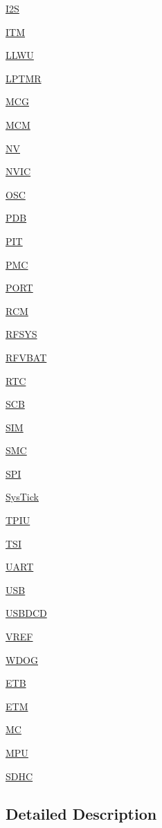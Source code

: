 \begin{DoxyCompactItemize}
\hyperlink{group___i2_s___peripheral}{I2S}
\item 
\hyperlink{group___i_t_m___peripheral}{I\+TM}
\item 
\hyperlink{group___l_l_w_u___peripheral}{L\+L\+WU}
\item 
\hyperlink{group___l_p_t_m_r___peripheral}{L\+P\+T\+MR}
\item 
\hyperlink{group___m_c_g___peripheral}{M\+CG}
\item 
\hyperlink{group___m_c_m___peripheral}{M\+CM}
\item 
\hyperlink{group___n_v___peripheral}{NV}
\item 
\hyperlink{group___n_v_i_c___peripheral}{N\+V\+IC}
\item 
\hyperlink{group___o_s_c___peripheral}{O\+SC}
\item 
\hyperlink{group___p_d_b___peripheral}{P\+DB}
\item 
\hyperlink{group___p_i_t___peripheral}{P\+IT}
\item 
\hyperlink{group___p_m_c___peripheral}{P\+MC}
\item 
\hyperlink{group___p_o_r_t___peripheral}{P\+O\+RT}
\item 
\hyperlink{group___r_c_m___peripheral}{R\+CM}
\item 
\hyperlink{group___r_f_s_y_s___peripheral}{R\+F\+S\+YS}
\item 
\hyperlink{group___r_f_v_b_a_t___peripheral}{R\+F\+V\+B\+AT}
\item 
\hyperlink{group___r_t_c___peripheral}{R\+TC}
\item 
\hyperlink{group___s_c_b___peripheral}{S\+CB}
\item 
\hyperlink{group___s_i_m___peripheral}{S\+IM}
\item 
\hyperlink{group___s_m_c___peripheral}{S\+MC}
\item 
\hyperlink{group___s_p_i___peripheral}{S\+PI}
\item 
\hyperlink{group___sys_tick___peripheral}{Sys\+Tick}
\item 
\hyperlink{group___t_p_i_u___peripheral}{T\+P\+IU}
\item 
\hyperlink{group___t_s_i___peripheral}{T\+SI}
\item 
\hyperlink{group___u_a_r_t___peripheral}{U\+A\+RT}
\item 
\hyperlink{group___u_s_b___peripheral}{U\+SB}
\item 
\hyperlink{group___u_s_b_d_c_d___peripheral}{U\+S\+B\+D\+CD}
\item 
\hyperlink{group___v_r_e_f___peripheral}{V\+R\+EF}
\item 
\hyperlink{group___w_d_o_g___peripheral}{W\+D\+OG}
\item 
\hyperlink{group___e_t_b___peripheral}{E\+TB}
\item 
\hyperlink{group___e_t_m___peripheral}{E\+TM}
\item 
\hyperlink{group___m_c___peripheral}{MC}
\item 
\hyperlink{group___m_p_u___peripheral}{M\+PU}
\item 
\hyperlink{group___s_d_h_c___peripheral}{S\+D\+HC}
\end{DoxyCompactItemize}


\subsection{Detailed Description}
